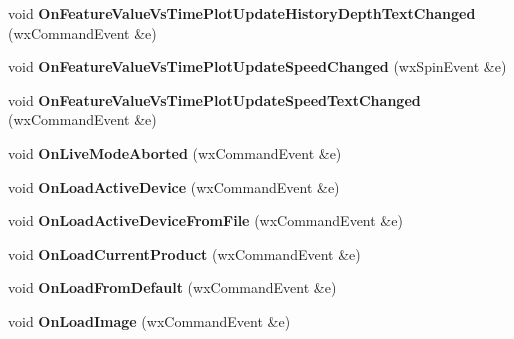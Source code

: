 \begin{DoxyCompactItemize}
\item 
\hypertarget{class_prop_view_frame_a7cb4d1f17c3c55cfb811a75f376b925d}{void {\bfseries On\+Feature\+Value\+Vs\+Time\+Plot\+Update\+History\+Depth\+Text\+Changed} (wx\+Command\+Event \&e)}\label{class_prop_view_frame_a7cb4d1f17c3c55cfb811a75f376b925d}

\item 
\hypertarget{class_prop_view_frame_acd6a10841006c505e89865a8957a209c}{void {\bfseries On\+Feature\+Value\+Vs\+Time\+Plot\+Update\+Speed\+Changed} (wx\+Spin\+Event \&e)}\label{class_prop_view_frame_acd6a10841006c505e89865a8957a209c}

\item 
\hypertarget{class_prop_view_frame_adf959ae552a464dd432239ee03998f94}{void {\bfseries On\+Feature\+Value\+Vs\+Time\+Plot\+Update\+Speed\+Text\+Changed} (wx\+Command\+Event \&e)}\label{class_prop_view_frame_adf959ae552a464dd432239ee03998f94}

\item 
\hypertarget{class_prop_view_frame_a3ce18b32a2dde924331770973cf4d9a6}{void {\bfseries On\+Live\+Mode\+Aborted} (wx\+Command\+Event \&e)}\label{class_prop_view_frame_a3ce18b32a2dde924331770973cf4d9a6}

\item 
\hypertarget{class_prop_view_frame_a6787295e922eaf57eb0a925fb6a4a861}{void {\bfseries On\+Load\+Active\+Device} (wx\+Command\+Event \&e)}\label{class_prop_view_frame_a6787295e922eaf57eb0a925fb6a4a861}

\item 
\hypertarget{class_prop_view_frame_ae06f3c28171450cbfdccc4b96bb9d166}{void {\bfseries On\+Load\+Active\+Device\+From\+File} (wx\+Command\+Event \&e)}\label{class_prop_view_frame_ae06f3c28171450cbfdccc4b96bb9d166}

\item 
\hypertarget{class_prop_view_frame_a84b8680aed1338f460f59530bd3ecf8d}{void {\bfseries On\+Load\+Current\+Product} (wx\+Command\+Event \&e)}\label{class_prop_view_frame_a84b8680aed1338f460f59530bd3ecf8d}

\item 
\hypertarget{class_prop_view_frame_ade507456da51c5aa03ab2b2815a7a74d}{void {\bfseries On\+Load\+From\+Default} (wx\+Command\+Event \&e)}\label{class_prop_view_frame_ade507456da51c5aa03ab2b2815a7a74d}

\item 
\hypertarget{class_prop_view_frame_ab2017f1f57caadee3f7eb10c76b44a0a}{void {\bfseries On\+Load\+Image} (wx\+Command\+Event \&e)}\label{class_prop_view_frame_ab2017f1f57caadee3f7eb10c76b44a0a}


\end{DoxyCompactItemize}
